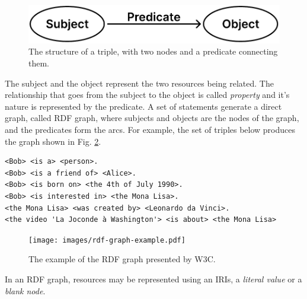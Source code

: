 \begin{figure}[!ht]
    \centering
    \includegraphics[width=0.55\columnwidth]{images/rdf-graph-structure.pdf}
    \caption{The structure of a triple, with two nodes and a predicate connecting them.}
    \label{fig:rdf-graph-structure}
\end{figure}

The subject and the object represent the two resources being related. The relationship that goes from the subject to the object is called \textit{property} and it's nature is represented by the predicate. A set of statements generate a direct graph, called RDF graph, where subjects and objects are the nodes of the graph, and the predicates form the arcs. For example, the set of triples below produces the graph shown in Fig. \ref{fig:rdf-graph-examle}.

\begin{verbatim}
<Bob> <is a> <person>.
<Bob> <is a friend of> <Alice>.
<Bob> <is born on> <the 4th of July 1990>.
<Bob> <is interested in> <the Mona Lisa>.
<the Mona Lisa> <was created by> <Leonardo da Vinci>.
<the video 'La Joconde à Washington'> <is about> <the Mona Lisa>
\end{verbatim}

\begin{figure}[!ht]
    \centering
    \texttt{[image: images/rdf-graph-example.pdf]}
    \caption{The example of the \ac{RDF} graph presented by \ac{W3C}.}
    \label{fig:rdf-graph-examle}
\end{figure}

In an \ac{RDF} graph, resources may be represented using an \acp{IRI}, a \textit{literal value} or a \textit{blank node}.





